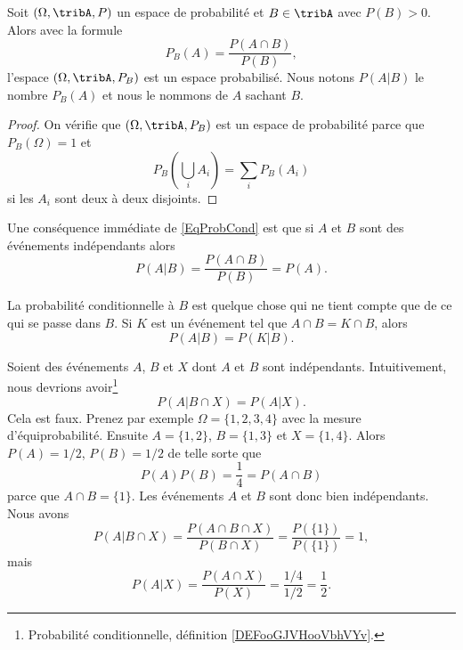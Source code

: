 \begin{propositionDef}      \label{DEFooGJVHooVbhVYv}
	Soit \( (\Omega,\tribA,P)\) un espace de probabilité et \( B\in\tribA\) avec \( P(B)>0\). Alors avec la formule
	\begin{equation}    \label{EqProbCond}
		P_B(A)=\frac{ P(A\cap B) }{ P(B) },
	\end{equation}
	l'espace \( (\Omega,\tribA,P_B)\) est un espace probabilisé. Nous notons \( P(A|B)\) le nombre \( P_B(A) \) et nous le nommons  de \( A\) sachant \( B\).
\end{propositionDef}

\begin{proof}
	On vérifie que \( (\Omega,\tribA,P_B)\) est un espace de probabilité parce que \( P_B(\Omega)=1\) et
	\begin{equation}
		P_B(\bigcup_iA_i)=\sum_iP_B(A_i)
	\end{equation}
	si les \( A_i\) sont deux à deux disjoints.
\end{proof}

Une conséquence immédiate de \eqref{EqProbCond} est que si \( A\) et \( B\) sont des événements indépendants alors
\begin{equation}
	P(A|B)=\frac{ P(A\cap B) }{ P(B) }=P(A).
\end{equation}

La probabilité conditionnelle à \( B\) est quelque chose qui ne tient compte que de ce qui se passe dans \( B\). Si \( K\) est un événement tel que \( A\cap B=K\cap B\), alors
\begin{equation}    \label{EqOVHCWom}
	P(A|B)=P(K|B).
\end{equation}


\begin{example}       \label{EXooIAYTooFjFTrT}
	Soient des événements \( A\), \( B\) et \( X\) dont \( A\) et \( B\) sont indépendants. Intuitivement, nous devrions avoir\footnote{Probabilité conditionnelle, définition \ref{DEFooGJVHooVbhVYv}.}
	\begin{equation}
		P(A|B\cap X)=P(A|X).
	\end{equation}
	Cela est faux. Prenez par exemple \( \Omega=\{ 1,2,3,4 \}\) avec la mesure d'équiprobabilité. Ensuite \( A=\{ 1,2 \}\), \( B=\{ 1,3 \}\) et \( X=\{ 1,4 \}\). Alors \( P(A)=1/2\), \( P(B)=1/2\) de telle sorte que
	\begin{equation}
		P(A)P(B)=\frac{1}{ 4 }=P(A\cap B)
	\end{equation}
	parce que \( A\cap B=\{ 1 \}\). Les événements \( A\) et \( B\) sont donc bien indépendants. Nous avons
	\begin{equation}
		P(A|B\cap X)=\frac{ P(A\cap B\cap X) }{ P(B\cap X) }=\frac{ P(\{ 1 \}) }{ P(\{ 1 \})  }=1,
	\end{equation}
	mais
	\begin{equation}
		P(A|X)=\frac{ P(A\cap X) }{ P(X) }=\frac{ 1/4 }{ 1/2 }=\frac{1}{ 2 }.
	\end{equation}
\end{example}


